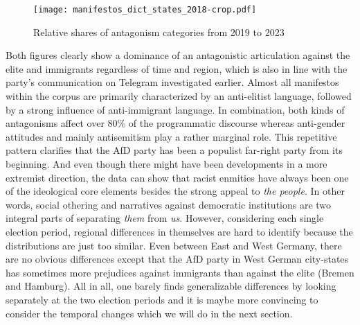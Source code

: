 \documentclass[a4paper]{scrreprt}
\begin{document}
\begin{figure}[ht]
    \centering
    \texttt{[image: manifestos\_dict\_states\_2018-crop.pdf]}
    \caption{Relative shares of antagonism categories from 2019 to 2023}
    \label{fig:fig4}
\end{figure}
Both figures clearly show a dominance of an antagonistic articulation against the elite and immigrants regardless of time and region, which is also in line with the party's communication on Telegram investigated earlier. Almost all manifestos within the corpus are primarily characterized by an anti-elitist language, followed by a strong influence of anti-immigrant language. In combination, both kinds of antagonisms affect over 80\% of the programmatic discourse whereas anti-gender attitudes and mainly antisemitism play a rather marginal role. This repetitive pattern clarifies that the AfD party has been a populist far-right party from its beginning. And even though there might have been developments in a more extremist direction, the data can show that racist enmities have always been one of the ideological core elements besides the strong appeal to {\em the people}. In other words, social othering and narratives against democratic institutions are two integral parts of separating {\em them} from {\em us}. However, considering each single election period, regional differences in themselves are hard to identify because the distributions are just too similar. Even between East and West Germany, there are no obvious differences except that the AfD party in West German city-states has sometimes more prejudices against immigrants than against the elite (Bremen and Hamburg). All in all, one barely finds generalizable differences by looking separately at the two election periods and it is maybe more convincing to consider the temporal changes which we will do in the next section.
\end{document}
